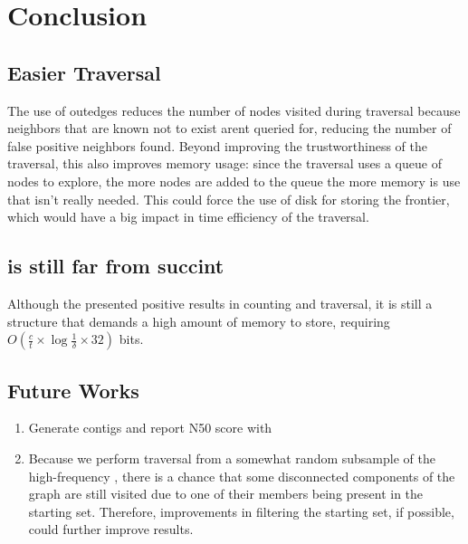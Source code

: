 \chapter{Conclusion}

\section{Easier Traversal}

The use of outedges reduces the number of nodes visited during traversal because neighbors that are known not to exist arent queried for, reducing the number of false positive neighbors found. Beyond improving the trustworthiness of the traversal, this also improves memory usage: since the traversal uses a queue of nodes to explore, the more nodes are added to the queue the more memory is use that isn't really needed. This could force the use of disk for storing the frontier, which would have a big impact in time efficiency of the traversal.

\section{\dBCM is still far from succint}

Although the \dBCM presented positive results in counting and traversal, it is still a structure that demands a high amount of memory to store, requiring $O(\frac{c}{t} \times \log \frac{1}{\delta} \times 32)$ bits.

\section{Future Works}

\begin{enumerate}
\item Generate contigs and report N50 score with \dBHT
\item Because we perform traversal from a somewhat random subsample of the high-frequency , there is a chance that some disconnected components of the graph are still visited due to one of their members being present in the starting set. Therefore, improvements in filtering the starting set, if possible, could further improve results.
\end{enumerate}
